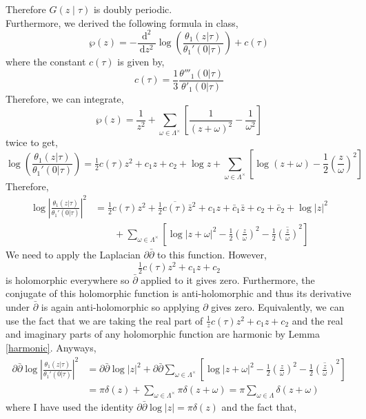 \documentclass[12pt]{extarticle}
\renewcommand{\d}[1]{\: \mathrm{d}#1 \:}
\newcommand{\dn}[2]{\: \mathrm{d}^{#1} #2 \:}
\newcommand{\nderiv}[3]{\frac{\dn{#1}{#2}}{\d{#3^2}}}
\theoremstyle{definition}
\begin{document}
Therefore $G(z \mid \tau)$ is doubly periodic. 
\bigskip\\
Furthermore, we derived the following formula in class,
\[ \wp(z) = - \nderiv{2}{}{z} \log{\left( \frac{\theta_1(z | \tau)}{\theta_1'(0 | \tau)} \right)} + c(\tau) \]
where the constant $c(\tau)$ is given by,
\[ c(\tau) = \frac{1}{3} \frac{\theta'''_1(0 | \tau)}{\theta'_1(0 | \tau)} \]
Therefore, we can integrate,
\[ \wp(z) = \frac{1}{z^2} + \sum_{\omega \in \Lambda^{\times}} \left[ \frac{1}{(z + \omega)^2} - \frac{1}{\omega^2} \right] \]
twice to get,
\[ \log{\left( \frac{\theta_1(z | \tau)}{\theta_1'(0 | \tau)} \right)} = \tfrac{1}{2} c(\tau) z^2 + c_1 z + c_2 + \log{z} + \sum_{\omega \in \Lambda^\times} \left[ \log{(z + \omega)} - \frac{1}{2} \left( \frac{z}{\omega} \right)^2 \right] \]
Therefore,
\begin{align*}
\log{\left| \frac{\theta_1(z | \tau)}{\theta_1'(0 | \tau)} \right|^2} & = \tfrac{1}{2} c(\tau)z^2 + \tfrac{1}{2} \overline{c(\tau)} \bar{z}^2 + c_1 z + \bar{c}_1 \bar{z} + c_2 + \bar{c}_2 + \log{|z|^2} 
\\
& \quad \quad + \sum_{\omega \in \Lambda^\times} \left[ \log{|z + \omega|^2} - \frac{1}{2} \left( \frac{z}{\omega} \right)^2 - \frac{1}{2} \overline{\left( \frac{z}{\omega} \right)}^2 \right] 
\end{align*}
We need to apply the Laplacian $\partial \bar{\partial}$ to this function. However, 
\[ \tfrac{1}{2} c(\tau) z^2 + c_1 z + c_2 \]
is holomorphic everywhere so $\bar{\partial}$ applied to it gives zero. Furthermore, the conjugate of this holomorphic function is anti-holomorphic and thus its derivative under $\bar{\partial}$ is again anti-holomorphic so applying $\partial$ gives zero. Equivalently, we can use the fact that we are taking the real part of $\tfrac{1}{z} c(\tau) z^2 + c_1 z + c_2$ and the real and imaginary parts of any holomorphic function are harmonic by Lemma \ref{harmonic}. Anyways,
\begin{align*}
\partial \bar{\partial} \log{\left| \frac{\theta_1(z | \tau)}{\theta_1'(0 | \tau)} \right|^2} & = \partial \bar{\partial} \log{|z|^2} + \partial \bar{\partial} \sum_{\omega \in \Lambda^\times} \left[ \log{|z + \omega|^2} - \frac{1}{2} \left( \frac{z}{\omega} \right)^2 - \frac{1}{2} \overline{\left( \frac{z}{\omega} \right)}^2 \right]
\\
& = \pi \delta(z) + \sum_{\omega \in \Lambda^\times} \pi \delta(z + \omega) = \pi \sum_{\omega \in \Lambda} \delta(z + \omega) 
\end{align*} 
where I have used the identity $\partial \bar{\partial} \log{|z|} = \pi \delta(z)$ and the fact that,
\end{document}
